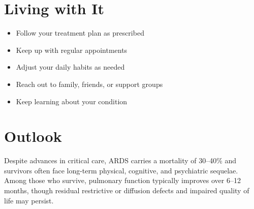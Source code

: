 \section{Living with It}

\begin{itemize}[noitemsep]
  \item Follow your treatment plan as prescribed
  \item Keep up with regular appointments
  \item Adjust your daily habits as needed
  \item Reach out to family, friends, or support groups
  \item Keep learning about your condition
\end{itemize}

\section{Outlook}
Despite advances in critical care, ARDS carries a mortality of 30--40\% and survivors often face long-term physical, cognitive, and psychiatric sequelae. Among those who survive, pulmonary function typically improves over 6--12 months, though residual restrictive or diffusion defects and impaired quality of life may persist.
